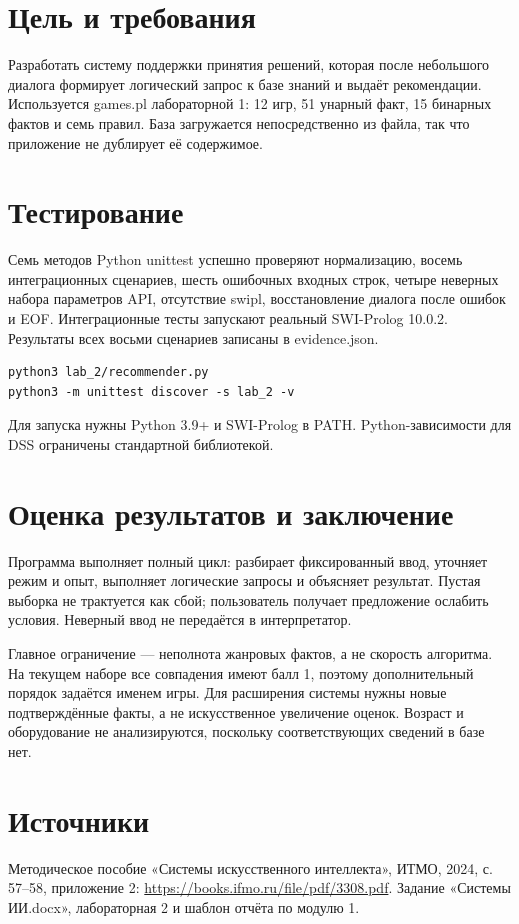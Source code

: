 

\section{Цель и требования}
Разработать систему поддержки принятия решений, которая после небольшого
диалога формирует логический запрос к базе знаний и выдаёт рекомендации.
Используется games.pl лабораторной 1: 12 игр, 51 унарный факт,
15 бинарных фактов и семь правил. База загружается непосредственно из файла,
так что приложение не дублирует её содержимое.

\section{Тестирование}
Семь методов Python unittest успешно проверяют нормализацию, восемь
интеграционных сценариев, шесть ошибочных входных строк, четыре неверных
набора параметров API, отсутствие swipl, восстановление диалога после
ошибок и EOF. Интеграционные тесты запускают реальный SWI-Prolog 10.0.2.
Результаты всех восьми сценариев записаны в evidence.json.
\begin{lstlisting}
python3 lab_2/recommender.py
python3 -m unittest discover -s lab_2 -v
\end{lstlisting}
Для запуска нужны Python 3.9+ и SWI-Prolog в PATH.
Python-зависимости для DSS ограничены стандартной библиотекой.

\section{Оценка результатов и заключение}
Программа выполняет полный цикл: разбирает фиксированный ввод, уточняет
режим и опыт, выполняет логические запросы и объясняет результат.
Пустая выборка не трактуется как сбой; пользователь получает предложение
ослабить условия. Неверный ввод не передаётся в интерпретатор.

Главное ограничение --- неполнота жанровых фактов, а не скорость алгоритма.
На текущем наборе все совпадения имеют балл 1, поэтому дополнительный порядок
задаётся именем игры. Для расширения системы нужны новые подтверждённые факты,
а не искусственное увеличение оценок. Возраст и оборудование не анализируются,
поскольку соответствующих сведений в базе нет.

\section{Источники}
Методическое пособие «Системы искусственного интеллекта», ИТМО, 2024,
с. 57--58, приложение 2: \url{https://books.ifmo.ru/file/pdf/3308.pdf}.
Задание «Системы ИИ.docx», лабораторная 2 и шаблон отчёта по модулю 1.


